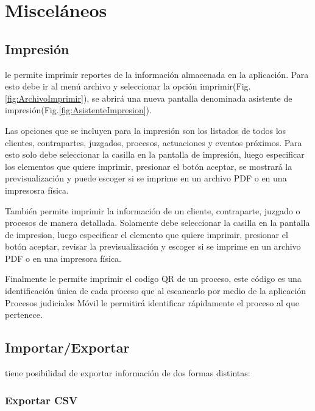 \chapter{Miscel\'aneos}
\label{sec:miscelaneo}

\section{Impresi\'on}

\softwareAbogadosDesktop le permite imprimir reportes de la informaci\'on almacenada en la aplicaci\'on. Para esto debe ir al men\'u archivo y seleccionar la opci\'on imprimir(Fig.\ref{fig:ArchivoImprimir}), se abrir\'a una nueva pantalla denominada asistente de impresi\'on(Fig.\ref{fig:AsistenteImpresion}). 
  

Las opciones que se incluyen para la impresi\'on son los listados de todos los  clientes, contrapartes, juzgados, procesos, actuaciones y eventos pr\'oximos. Para esto solo debe seleccionar la casilla en la pantalla de impresi\'on, luego especificar los elementos que quiere imprimir, presionar el bot\'on aceptar, se mostrar\'a la previsualizaci\'on y puede escoger si se imprime en un archivo PDF o en una impresosra f\'isica.
 
Tambi\'en permite imprimir la informaci\'on de un cliente, contraparte, juzgado o procesos de manera detallada. Solamente debe seleccionar la casilla en la pantalla de impresion, luego especificar el elemento que quiere imprimir, presionar el bot\'on aceptar, revisar la previsualizaci\'on y escoger si se imprime en un archivo PDF o en una impresora f\'isica.
 
Finalmente le permite imprimir el codigo QR de un proceso, este c\'odigo es una identificaci\'on \'unica de cada proceso que al escanearlo por medio de la aplicaci\'on Procesos judiciales M\'ovil le permitir\'a identificar r\'apidamente el proceso al que pertenece.

\section{Importar/Exportar}

\softwareAbogadosDesktop tiene posibilidad de exportar informaci\'on de dos formas distintas:

\subsection{Exportar CSV}

